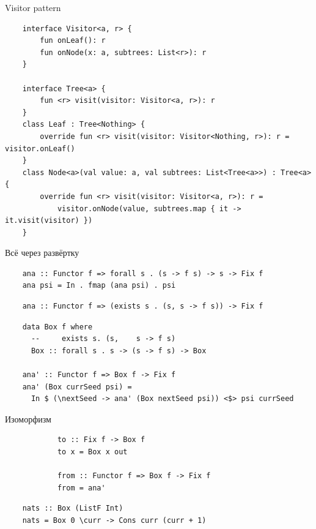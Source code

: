     \begin{frame}[fragile]{Visitor pattern}
        \pause
        \begin{verbatim}
    interface Visitor<a, r> {
        fun onLeaf(): r
        fun onNode(x: a, subtrees: List<r>): r
    }

    interface Tree<a> {
        fun <r> visit(visitor: Visitor<a, r>): r
    }
    class Leaf : Tree<Nothing> {
        override fun <r> visit(visitor: Visitor<Nothing, r>): r = visitor.onLeaf()
    }
    class Node<a>(val value: a, val subtrees: List<Tree<a>>) : Tree<a> {
        override fun <r> visit(visitor: Visitor<a, r>): r =
            visitor.onNode(value, subtrees.map { it -> it.visit(visitor) })
    }
        \end{verbatim}
    \end{frame}


    \begin{frame}[fragile]{Всё через развёртку}
        \pause
        \begin{verbatim}
    ana :: Functor f => forall s . (s -> f s) -> s -> Fix f
    ana psi = In . fmap (ana psi) . psi
        \end{verbatim}
        \pause\vspace{1em}
        \begin{verbatim}
    ana :: Functor f => (exists s . (s, s -> f s)) -> Fix f
        \end{verbatim}
        \pause\vspace{1em}
        \begin{verbatim}
    data Box f where
      --     exists s. (s,    s -> f s)
      Box :: forall s . s -> (s -> f s) -> Box

    ana' :: Functor f => Box f -> Fix f
    ana' (Box currSeed psi) =
      In $ (\nextSeed -> ana' (Box nextSeed psi)) <$> psi currSeed
        \end{verbatim}
    \end{frame}

    \begin{frame}[fragile]{Изоморфизм}
        \pause
        \begin{verbatim}
            to :: Fix f -> Box f
            to x = Box x out

            from :: Functor f => Box f -> Fix f
            from = ana'
        \end{verbatim}
        \pause\vspace{1em}
        \begin{verbatim}
    nats :: Box (ListF Int)
    nats = Box 0 \curr -> Cons curr (curr + 1)
        \end{verbatim}
    \end{frame}

